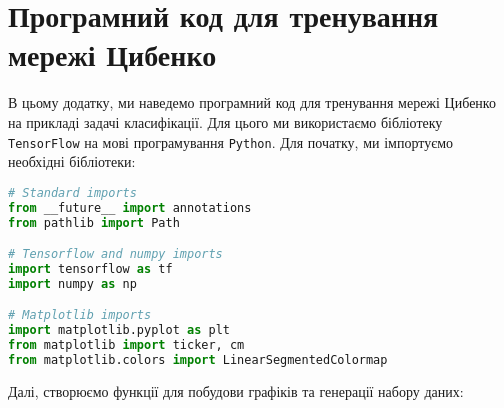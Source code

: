 \appendix

\chapter{Програмний код для тренування мережі Цибенко}\label{appendix:cybenko-code}

В цьому додатку, ми наведемо програмний код для тренування мережі Цибенко на
прикладі задачі класифікації. Для цього ми використаємо бібліотеку
\texttt{TensorFlow} на мові програмування \texttt{Python}. Для початку, ми 
імпортуємо необхідні бібліотеки:

\begin{lstlisting}[language=Python]
# Standard imports
from __future__ import annotations
from pathlib import Path

# Tensorflow and numpy imports
import tensorflow as tf
import numpy as np

# Matplotlib imports
import matplotlib.pyplot as plt
from matplotlib import ticker, cm 
from matplotlib.colors import LinearSegmentedColormap
\end{lstlisting}

Далі, створюємо функції для побудови графіків та генерації набору даних:

